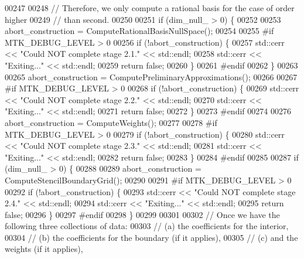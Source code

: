 \begin{DoxyCode}
{{00247 
00248   \textcolor{comment}{// Therefore, we only compute a rational basis for the case of order higher}
00249   \textcolor{comment}{// than second.}
00250 
00251   \textcolor{keywordflow}{if} (dim\_null\_ > 0) \{
00252 
00253     abort\_construction = ComputeRationalBasisNullSpace();
00254 
00255 \textcolor{preprocessor}{    #if MTK\_DEBUG\_LEVEL > 0}
00256     \textcolor{keywordflow}{if} (!abort\_construction) \{
00257       std::cerr << \textcolor{stringliteral}{"Could NOT complete stage 2.1."} << std::endl;
00258       std::cerr << \textcolor{stringliteral}{"Exiting..."} << std::endl;
00259       \textcolor{keywordflow}{return} \textcolor{keyword}{false};
00260     \}
00261 \textcolor{preprocessor}{    #endif}
00262   \}
00263 
00265   abort\_construction = ComputePreliminaryApproximations();
00266 
00267 \textcolor{preprocessor}{  #if MTK\_DEBUG\_LEVEL > 0}
00268   \textcolor{keywordflow}{if} (!abort\_construction) \{
00269     std::cerr << \textcolor{stringliteral}{"Could NOT complete stage 2.2."} << std::endl;
00270     std::cerr << \textcolor{stringliteral}{"Exiting..."} << std::endl;
00271     \textcolor{keywordflow}{return} \textcolor{keyword}{false};
00272   \}
00273 \textcolor{preprocessor}{  #endif}
00274 
00276   abort\_construction = ComputeWeights();
00277 
00278 \textcolor{preprocessor}{  #if MTK\_DEBUG\_LEVEL > 0}
00279   \textcolor{keywordflow}{if} (!abort\_construction) \{
00280     std::cerr << \textcolor{stringliteral}{"Could NOT complete stage 2.3."} << std::endl;
00281     std::cerr << \textcolor{stringliteral}{"Exiting..."} << std::endl;
00282     \textcolor{keywordflow}{return} \textcolor{keyword}{false};
00283   \}
00284 \textcolor{preprocessor}{  #endif}
00285 
00287   \textcolor{keywordflow}{if} (dim\_null\_ > 0) \{
00288 
00289     abort\_construction = ComputeStencilBoundaryGrid();
00290 
00291 \textcolor{preprocessor}{    #if MTK\_DEBUG\_LEVEL > 0}
00292     \textcolor{keywordflow}{if} (!abort\_construction) \{
00293       std::cerr << \textcolor{stringliteral}{"Could NOT complete stage 2.4."} << std::endl;
00294       std::cerr << \textcolor{stringliteral}{"Exiting..."} << std::endl;
00295       \textcolor{keywordflow}{return} \textcolor{keyword}{false};
00296     \}
00297 \textcolor{preprocessor}{    #endif}
00298   \}
00299 
00301 
00302   \textcolor{comment}{// Once we have the following three collections of data:}
00303   \textcolor{comment}{//   (a) the coefficients for the interior,}
00304   \textcolor{comment}{//   (b) the coefficients for the boundary (if it applies),}
00305   \textcolor{comment}{//   (c) and the weights (if it applies),}
}}
\end{DoxyCode}
